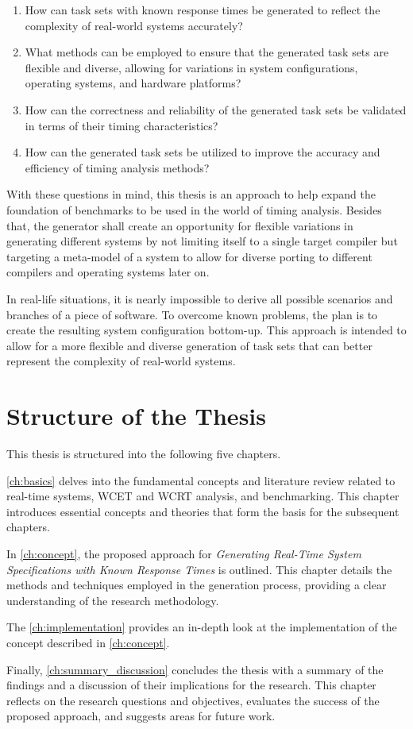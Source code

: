 \begin{enumerate}
	\item How can task sets with known response times be generated to reflect the complexity of real-world systems accurately?
	\item What methods can be employed to ensure that the generated task sets are flexible and diverse, allowing for variations in system configurations, operating systems, and hardware platforms?
	\item How can the correctness and reliability of the generated task sets be validated in terms of their timing characteristics?
	\item How can the generated task sets be utilized to improve the accuracy and efficiency of timing analysis methods?
\end{enumerate}

With these questions in mind, this thesis is an approach to help expand the foundation of benchmarks to be used in the world of timing analysis.
Besides that, the generator shall create an opportunity for flexible variations in generating different systems by not limiting itself to a single target compiler but targeting a meta-model of a system to allow for diverse porting to different compilers and operating systems later on.

In real-life situations, it is nearly impossible to derive all possible scenarios and branches of a piece of software. 
To overcome known problems, the plan is to create the resulting system configuration bottom-up.
This approach is intended to allow for a more flexible and diverse generation of task sets that can better represent the complexity of real-world systems.

\section{Structure of the Thesis}\label{sec:structure}
This thesis is structured into the following five chapters.

\cref{ch:basics} delves into the fundamental concepts and literature review related to real-time systems, \ac{WCET} and \ac{WCRT} analysis, and benchmarking. 
This chapter introduces essential concepts and theories that form the basis for the subsequent chapters.

In \cref{ch:concept}, the proposed approach for \textit{Generating Real-Time System Specifications with Known Response Times} is outlined. 
This chapter details the methods and techniques employed in the generation process, providing a clear understanding of the research methodology.

The \cref{ch:implementation} provides an in-depth look at the implementation of the concept described in \cref{ch:concept}.
 
Finally, \cref{ch:summary_discussion} concludes the thesis with a summary of the findings and a discussion of their implications for the research. 
This chapter reflects on the research questions and objectives, evaluates the success of the proposed approach, and suggests areas for future work.